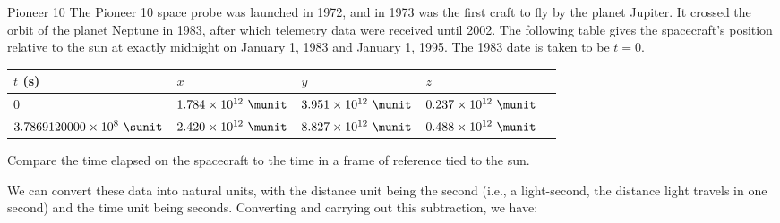 \begin{eg}{Pioneer 10}\label{eg:pioneer-interval}
\egquestion The Pioneer 10 space probe was launched in 1972, and in 1973 was the first craft to
fly by the planet Jupiter. It crossed the orbit of the planet Neptune in 1983, after which telemetry
data were received until 2002. The following table gives the spacecraft's position relative to the
sun at exactly midnight on January 1, 1983 and January 1, 1995. The 1983 date is taken to be $t=0$.

\begin{tabular}{lllll}
$t$ (s) & $x$ & $y$ & $z$ \\
\hline
0       & $1.784\times10^{12}\ \munit$  &  $3.951\times10^{12}\ \munit$  & $0.237\times10^{12}\ \munit$ \\
$3.7869120000\times10^{8}\ \sunit$ 
               & $2.420\times10^{12}\ \munit$  &  $8.827\times10^{12}\ \munit$  & $0.488\times10^{12}\ \munit$ \\
\end{tabular}

%
%

Compare the time elapsed on the spacecraft to the time in a frame of reference tied to the sun.

\eganswer
We can convert these data into natural units, with the distance unit being the second (i.e., a light-second,
the distance light travels in one second) and the time unit being seconds. Converting and carrying out this
subtraction, we have:


\end{eg}
